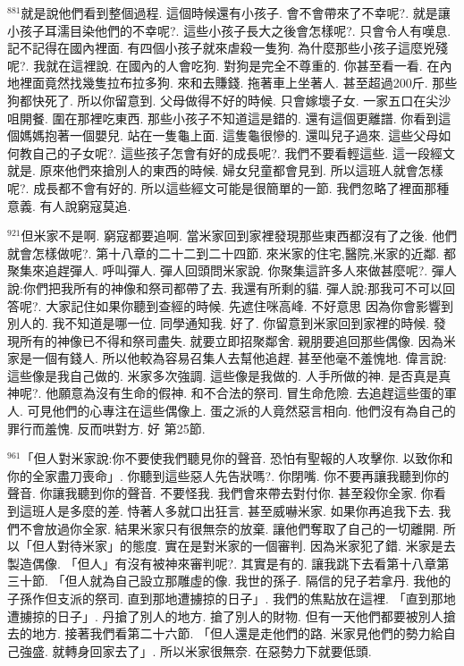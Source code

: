 \documentclass{book}
\begin{document}
$^{881}$就是說他們看到整個過程.
這個時候還有小孩子.
會不會帶來了不幸呢?.
就是讓小孩子耳濡目染他們的不幸呢?.
這些小孩子長大之後會怎樣呢?.
只會令人有嘆息.
記不記得在國內裡面.
有四個小孩子就來虐殺一隻狗.
為什麼那些小孩子這麼兇殘呢?.
我就在這裡說.
在國內的人會吃狗.
對狗是完全不尊重的.
你甚至看一看.
在內地裡面竟然找幾隻拉布拉多狗.
來和去賺錢.
拖著車上坐著人.
甚至超過200斤.
那些狗都快死了.
所以你留意到.
父母做得不好的時候.
只會嫁壞子女.
一家五口在尖沙咀開餐.
圍在那裡吃東西.
那些小孩子不知道這是錯的.
還有這個更離譜.
你看到這個媽媽抱著一個嬰兒.
站在一隻龜上面.
這隻龜很慘的.
還叫兒子過來.
這些父母如何教自己的子女呢?.
這些孩子怎會有好的成長呢?.
我們不要看輕這些.
這一段經文就是.
原來他們來搶別人的東西的時候.
婦女兒童都會見到.
所以這班人就會怎樣呢?.
成長都不會有好的.
所以這些經文可能是很簡單的一節.
我們忽略了裡面那種意義.
有人說窮寇莫追.

$^{921}$但米家不是啊.
窮寇都要追啊.
當米家回到家裡發現那些東西都沒有了之後.
他們就會怎樣做呢?.
第十八章的二十二到二十四節.
來米家的住宅,醫院,米家的近鄰.
都聚集來追趕彈人.
呼叫彈人.
彈人回頭問米家說.
你聚集這許多人來做甚麼呢?.
彈人說:你們把我所有的神像和祭司都帶了去.
我還有所剩的貓.
彈人說:那我可不可以回答呢?.
大家記住如果你聽到查經的時候.
先遮住咪高峰.
不好意思 因為你會影響到別人的.
我不知道是哪一位.
同學通知我.
好了.
你留意到米家回到家裡的時候.
發現所有的神像已不得和祭司盡失.
就要立即招聚鄰舍.
親朋要追回那些偶像.
因為米家是一個有錢人.
所以他較為容易召集人去幫他追趕.
甚至他毫不羞愧地.
偉言說:這些像是我自己做的.
米家多次強調.
這些像是我做的.
人手所做的神.
是否真是真神呢?.
他願意為沒有生命的假神.
和不合法的祭司.
冒生命危險.
去追趕這些蛋的軍人.
可見他們的心專注在這些偶像上.
蛋之派的人竟然惡言相向.
他們沒有為自己的罪行而羞愧.
反而哄對方.
好 第25節.

$^{961}$「但人對米家說:你不要使我們聽見你的聲音.
恐怕有聖報的人攻擊你.
以致你和你的全家盡刀喪命」.
你聽到這些惡人先告狀嗎?.
你閉嘴.
你不要再讓我聽到你的聲音.
你讓我聽到你的聲音.
不要怪我.
我們會來帶去對付你.
甚至殺你全家.
你看到這班人是多麼的差.
恃著人多就口出狂言.
甚至威嚇米家.
如果你再追我下去.
我們不會放過你全家.
結果米家只有很無奈的放棄.
讓他們奪取了自己的一切離開.
所以「但人對待米家」的態度.
實在是對米家的一個審判.
因為米家犯了錯.
米家是去製造偶像.
「但人」有沒有被神來審判呢?.
其實是有的.
讓我跳下去看第十八章第三十節.
「但人就為自己設立那雕虛的像.
我世的孫子.
隔信的兒子若拿丹.
我他的子孫作但支派的祭司.
直到那地遭擄掠的日子」.
我們的焦點放在這裡.
「直到那地遭擄掠的日子」.
丹搶了別人的地方.
搶了別人的財物.
但有一天他們都要被別人搶去的地方.
接著我們看第二十六節.
「但人還是走他們的路.
米家見他們的勢力給自己強盛.
就轉身回家去了」.
所以米家很無奈.
在惡勢力下就要低頭.
\end{document}
